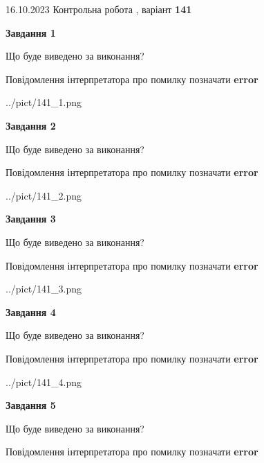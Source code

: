 \documentclass[12pt, ukrainian]{article}
\begin{document}
{\Large{16.10.2023 Контрольна робота , варіант  \No \textbf { 141 }\par}}
{
\begin {large}
{\begin {center}\textbf{Завдання 1}\end {center}}\par
Що буде виведено за виконання? \par
Повідомлення інтерпретатора про помилку позначати \textbf{error}

\begin{center}
	{../pict/141_1.png}
\end{center}
\newpage

{\begin {center}\textbf{Завдання 2}\end {center}}\par
Що буде виведено за виконання? \par
Повідомлення інтерпретатора про помилку позначати \textbf{error}

\begin{center}
	{../pict/141_2.png}
\end{center}
\newpage

{\begin {center}\textbf{Завдання 3}\end {center}}\par
Що буде виведено за виконання? \par
Повідомлення інтерпретатора про помилку позначати \textbf{error}

\begin{center}
	{../pict/141_3.png}
\end{center}
\newpage

{\begin {center}\textbf{Завдання 4}\end {center}}\par
Що буде виведено за виконання? \par
Повідомлення інтерпретатора про помилку позначати \textbf{error}

\begin{center}
	{../pict/141_4.png}
\end{center}
\newpage

{\begin {center}\textbf{Завдання 5}\end {center}}\par
Що буде виведено за виконання? \par
Повідомлення інтерпретатора про помилку позначати \textbf{error}


\end{large}}
\end{document}
